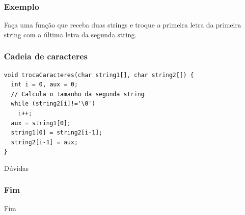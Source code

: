 \documentclass[aspectratio=169]{beamer}
\begin{document}

\begin{frame}[fragile]
\frametitle{Exemplo}
Faça uma função que receba duas strings e troque a primeira letra da primeira string com a última letra da segunda string.
\end{frame}


\begin{frame}[fragile]
\frametitle{Cadeia de caracteres}
\begin{lstlisting}
void trocaCaracteres(char string1[], char string2[]) {
  int i = 0, aux = 0;
  // Calcula o tamanho da segunda string
  while (string2[i]!='\0')
    i++;
  aux = string1[0];
  string1[0] = string2[i-1];
  string2[i-1] = aux;
}
\end{lstlisting}
\end{frame}

\begin{frame}
\Huge{\centerline{Dúvidas}}

\end{frame}



\begin{frame}
  \frametitle{Fim}
\begin{center}
\Huge Fim
\end{center}
\end{frame}
\end{document}
